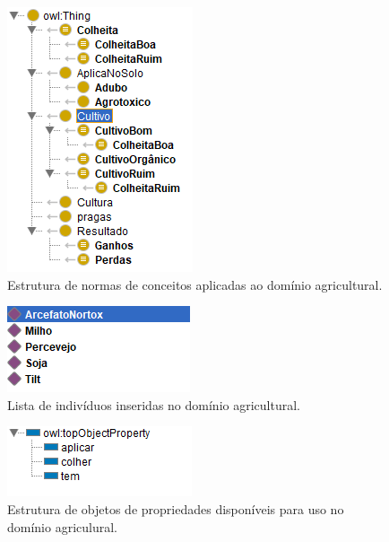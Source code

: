 \documentclass{article}
\begin{document}
    \begin{figure}[!htp]
        \centering %
        \includegraphics[width=.5\textwidth]{imagens/class.png} %
        \caption{Estrutura de normas de conceitos aplicadas ao domínio agricultural.}
        \label{figura:disjunt}
    \end{figure}
    
    \begin{figure}[!htp]
        \centering %
        \includegraphics[width=.5\textwidth]{imagens/Individuos.png} %
        \caption{Lista de indivíduos inseridas no domínio agricultural.}
        \label{figura:disjunt}
    \end{figure}
    
    \begin{figure}[!htp]
        \centering %
        \includegraphics[width=.5\textwidth]{imagens/Properties.png} %
        \caption{Estrutura de objetos de propriedades disponíveis para uso no domínio agriculural.}
        \label{figura:disjunt}
    \end{figure}
    
\end{document}
